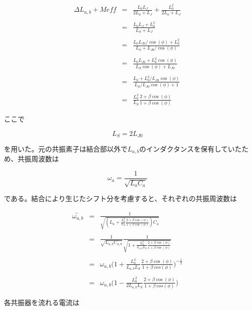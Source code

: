 \begin{eqnarray}
    \Delta L_{a,b} + M{eff} & = &  \frac{L_0L_J}{2L_0+L_J} + \frac{L_0^2}{2L_0+L_J}\\ \\
    & = & \frac{L_0 L_J + L_0^2}{L_S + L_J}\\ \\
    & = & \frac{L_0 L_{J0}/\cos (\phi) + L_0^2}{L_S + L_{J0}/\cos (\phi)}\\ \\
    & = & \frac{L_0 L_{J0} + L_0^2 \cos (\phi)}{L_S \cos (\phi) + L_{J0}}\\ \\
    & = & \frac{L_0 + L_0^2/L_{J0} \cos (\phi)}{L_S/L_{J0} \cos (\phi) + 1}\\ \\
    & = & \frac{L_0^2}{L_S}\frac{2 + \beta \cos (\phi)}{1+\beta \cos (\phi)}
\end{eqnarray}

ここで

\begin{equation}
    L_S = 2L_{J0}
\end{equation}

を用いた。元の共振素子は結合部以外で$L_{a,b}$のインダクタンスを保有していたため、共振周波数は

\begin{equation}
    \omega_a = \frac{1}{\sqrt{L_aC_a}}
\end{equation}

である。結合により生じたシフト分を考慮すると、それぞれの共振周波数は

\begin{eqnarray}
    \tilde{\omega_{a,b}} &=&  \frac{1}{\sqrt{(L_a+\frac{L_0^2}{L_S}\frac{2 + \beta \cos (\phi)}{1+\beta \cos (\phi)})C_a}}\\ \\
    & = &  \frac{1}{\sqrt{L_{a,b}C_{a,b}}} \frac{1}{\sqrt{1+\frac{L_0^2}{L_{a,b}L_S}\frac{2 + \beta \cos (\phi)}{1+\beta \cos (\phi)}}}\\ \\
    & = &  \omega_{a,b} \biggl(1+\frac{L_0^2}{L_{a,b}L_S}\frac{2 + \beta \cos (\phi)}{1+\beta\ cos(\phi)}\biggr)^{-\frac{1}{2}}\\ \\
    & = &  \omega_{a,b} \biggl(1-\frac{L_0^2}{2L_{a,b}L_S}\frac{2 + \beta \cos (\phi)}{1+\beta\ cos(\phi)}\biggr)
\end{eqnarray}

各共振器を流れる電流は


